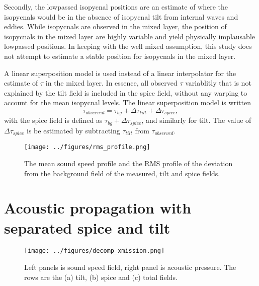 \documentclass[preprint,NumberedRefs]{JASA}
\begin{document}
Secondly, the lowpassed isopycnal positions are an estimate of where the isopycnals would be in the absence of isopycnal tilt from internal waves and eddies. While isopycnals are observed in the mixed layer, the position of isopycnals in the mixed layer are highly variable and yield physically implausable lowpassed positions. In keeping with the well mixed assumption, this study does not attempt to estimate a stable position for isopycnals in the mixed layer.

A linear superposition model is used instead of a linear interpolator for the estimate of $\tau$ in the mixed layer. In essence, all observed $\tau$ variablitly that is not explained by the tilt field is included in the spice field, without any warping to account for the mean isopycnal levels. The linear superposition model is written
\begin{equation}
    \tau_{observed} = \tau_{bg} + \Delta \tau_{tilt} + \Delta \tau_{spice},
\end{equation}
with the spice field is defined as $\tau_{bg} + \Delta \tau_{spice}$, and similarly for tilt. The value of $\Delta \tau_{spice}$ is be estimated by subtracting $\tau_{tilt}$ from $\tau_{observed}$.

\begin{figure}
\texttt{[image: ../figures/rms\_profile.png]}
    \caption{\label{fig:c_rms}{The mean sound speed profile and the RMS profile of the deviation from the background field of the measured, tilt and spice fields. }}
\end{figure}

\section{\label{sec:propagation}Acoustic propagation with separated spice and tilt}
\begin{figure}
\texttt{[image: ../figures/decomp\_xmission.png]}
    \caption{\label{fig:decomp_x}{Left panels is sound speed field, right panel is acoustic pressure. The rows are the (a) tilt, (b) spice and (c) total fields.}}
\end{figure}



\end{document}
